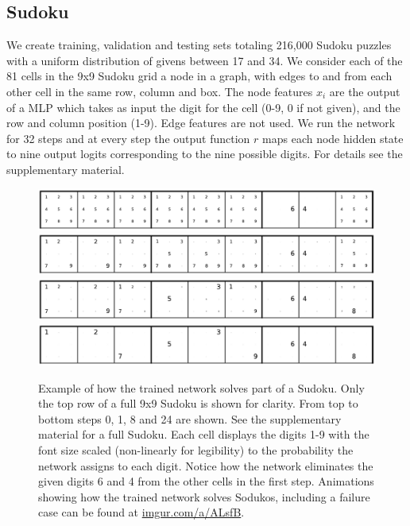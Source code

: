 \documentclass{article}
\begin{document}
\subsection{Sudoku} \label{sec:sudoku}
We create training, validation and testing sets totaling 216,000 Sudoku puzzles with a uniform distribution of givens between 17 and 34. We consider each of the 81 cells in the 9x9 Sudoku grid a node in a graph, with edges to and from each other cell in the same row, column and box. The node features $x_i$ are the output of a MLP which takes as input the digit for the cell (0-9, 0 if not given), and the row and column position (1-9). Edge features are not used. We run the network for 32 steps and at every step the output function $r$ maps each node hidden state to nine output logits corresponding to the nine possible digits. For details see the supplementary material.

\begin{figure}[!ht]
\centering
{\includegraphics[width=1.0\textwidth]{row/000-00.pdf}}
{\includegraphics[width=1.0\textwidth]{row/000-01.pdf}}
{\includegraphics[width=1.0\textwidth]{row/000-08.pdf}}
{\includegraphics[width=1.0\textwidth]{row/000-24.pdf}}
\caption{Example of how the trained network solves part of a Sudoku. Only the top row of a full 9x9 Sudoku is shown for clarity. From top to bottom steps 0, 1, 8 and 24 are shown. See the supplementary material for a full Sudoku. Each cell displays the digits 1-9 with the font size scaled (non-linearly for legibility) to the probability the network assigns to each digit. Notice how the network eliminates the given digits 6 and 4 from the other cells in the first step. Animations showing how the trained network solves Sodukos, including a failure case can be found at \href{https://imgur.com/a/ALsfB}{imgur.com/a/ALsfB}.}\label{fig:steps}
\end{figure}
\end{document}
